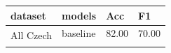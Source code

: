 





\begin{table}[!h]
\centering
\begin{tabular}{|l|l||ll|}
\hline
dataset                    & models      & Acc   & F1    \\ \hline \hline
\multirow{5}{*}{All Czech} & baseline    & 82.00 & 70.00 \\ \cline{2-4} 
                           
                           
                           

\end{tabular}
\end{table}
